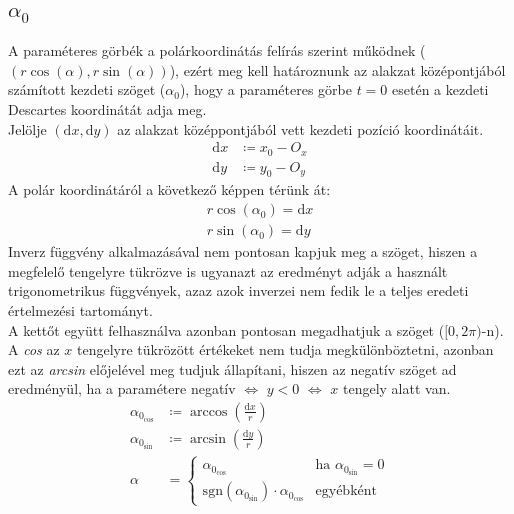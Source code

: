 \documentclass[a4paper]{article}
\newcommand{\dd}[1]{\mathrm{d}#1}
\newcommand{\sgn}[0]{\mathrm{sgn}}
\begin{document}
\begin{multicols}{2}
	\subsection{$\alpha_{0}$}
		A paraméteres görbék a polárkoordinátás felírás szerint működnek ($(r\cos(\alpha), r\sin(\alpha))$), ezért meg kell határoznunk az alakzat középontjából számított kezdeti szöget ($\alpha_{0}$), hogy a paraméteres görbe $t=0$ esetén a kezdeti Descartes koordinátát adja meg. \\
		Jelölje $(\dd{x}, \dd{y})$ az alakzat középpontjából vett kezdeti pozíció koordinátáit. 
		\begin{align*}
			\dd{x} &\coloneqq x_0-O_{x} \\
			\dd{y} &\coloneqq y_0-O_{y}
		\end{align*}
		A polár koordinátáról a következő képpen térünk át:
		\begin{align*}
			r \cos(\alpha_{0}) = \dd{x} \\
			r \sin(\alpha_{0}) = \dd{y}
		\end{align*}
		Inverz függvény alkalmazásával nem pontosan kapjuk meg a szöget, hiszen a megfelelő tengelyre tükrözve is ugyanazt az eredményt adják a használt trigonometrikus függvények, azaz azok inverzei nem fedik le a teljes eredeti értelmezési tartományt. \\
		A kettőt együtt felhasználva azonban pontosan megadhatjuk a szöget ($[0,2\pi)$-n). A \textit{cos} az $x$ tengelyre tükrözött értékeket nem tudja megkülönböztetni, azonban ezt az \textit{arcsin} előjelével meg tudjuk állapítani, hiszen az negatív szöget ad eredményül, ha a paramétere negatív $\Leftrightarrow$ $y < 0$ $\Leftrightarrow$ $x$ tengely alatt van.
		\begin{align*}
			\alpha_{0_{\cos}} &\coloneqq \arccos \left( \frac{\dd{x}}{r} \right) \\
			\alpha_{0_{\sin}} &\coloneqq \arcsin \left( \frac{\dd{y}}{r} \right) \\
			\alpha &= \left\{
				\begin{array}{rl}
					\alpha_{0_{\cos}} & \textrm{ha } \alpha_{0_{\sin}} = 0 \\
					\sgn(\alpha_{0_{\sin}}) \cdot \alpha_{0_{\cos}} & \textrm{egyébként}
				\end{array}
			\right.
		\end{align*}


\end{multicols}
\end{document}
